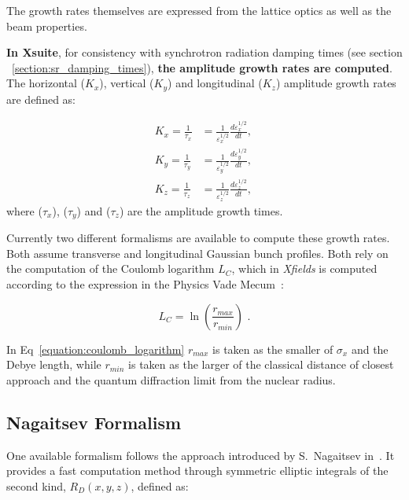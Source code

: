The growth rates themselves are expressed from the lattice optics as well as the beam properties.

\textbf{In Xsuite}, for consistency with synchrotron radiation damping times (see section ~\ref{section:sr_damping_times}), \textbf{the amplitude growth rates are computed}.
The horizontal (\(K_x\)), vertical (\(K_y\)) and longitudinal (\(K_z\)) amplitude growth rates are defined as:

\begin{equation}
    \begin{aligned}
        K_x = \frac{1}{\tau_x} &= \frac{1}{\varepsilon^{1/2}_x} \frac{d \varepsilon^{1/2}_x}{dt} \text{,  } \\
        K_y = \frac{1}{\tau_y} &= \frac{1}{\varepsilon^{1/2}_y} \frac{d \varepsilon^{1/2}_y}{dt} \text{,  } \\
        K_z = \frac{1}{\tau_z} &= \frac{1}{\varepsilon^{1/2}_z} \frac{d \varepsilon^{1/2}_z}{dt} \text{, }
    \end{aligned}
    \label{equation:ibs_rms_emittances_evolutions}
\end{equation}
where (\(\tau_x\)), (\(\tau_y\)) and (\(\tau_z\)) are the amplitude growth times.
\newline

Currently two different formalisms are available to compute these growth rates.
Both assume transverse and longitudinal Gaussian bunch profiles.
Both rely on the computation of the Coulomb logarithm \(L_C\), which in \textit{Xfields} is computed according to the expression in the Physics Vade Mecum~\cite{AIP:Anderson:Physics_Vade_Mecum}:

\begin{equation}
    L_C = \ln \left( \frac{r_{max}}{r_{min}} \right) \text{ .}
    \label{equation:coulomb_logarithm}
\end{equation}

In Eq~\eqref{equation:coulomb_logarithm} \(r_{max}\) is taken as the smaller of \(\sigma_x\) and the Debye length, while \(r_{min}\) is taken as the larger of the classical distance of closest approach and the quantum diffraction limit from the nuclear radius.

\subsection{Nagaitsev Formalism}
\label{subsection:nagaitsev_formalism}

One available formalism follows the approach introduced by S.~Nagaitsev in~\cite{PRAB:Nagaitsev:IBS_formulas_fast_numerical_evaluation}.
It provides a fast computation method through symmetric elliptic integrals of the second kind, \(R_D(x,y,z)\), defined as:

